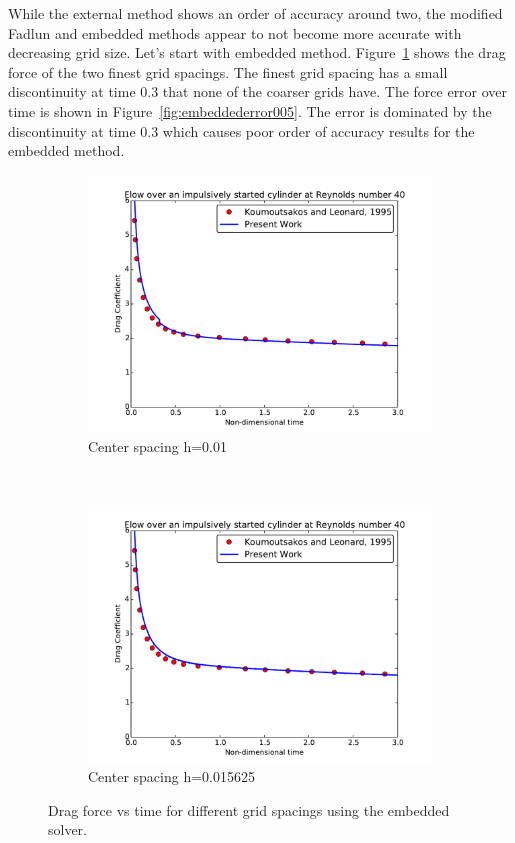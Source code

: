 \documentclass[onehalf,11pt]{beavtex}
\begin{document}
While the external method shows an order of accuracy around two, the modified Fadlun and embedded methods appear to not become more accurate with decreasing grid size. 
Let's start with embedded method. 
Figure~\ref{fig:embedded005} shows the drag force of the two finest grid spacings.
The finest grid spacing has a small discontinuity at time 0.3 that none of the coarser grids have. 
The force error over time is shown in Figure~\ref{fig:embeddederror005}. 
The error is dominated by the discontinuity at time 0.3 which causes poor order of accuracy results for the embedded method. 
\begin{figure}[!htb]
	\centering
	\begin{subfigure}{0.4\textwidth}
		\includegraphics[width=\linewidth]{embedded01}
		\caption{Center spacing h=0.01}
	\end{subfigure}
	~
	\begin{subfigure}{0.4\textwidth}
		\includegraphics[width=\linewidth]{embedded015625}
		\caption{Center spacing h=0.015625}
	\end{subfigure}
	\caption{Drag force vs time for different grid spacings using the embedded solver.}
	\label{fig:embedded005}
\end{figure}
\end{document}

